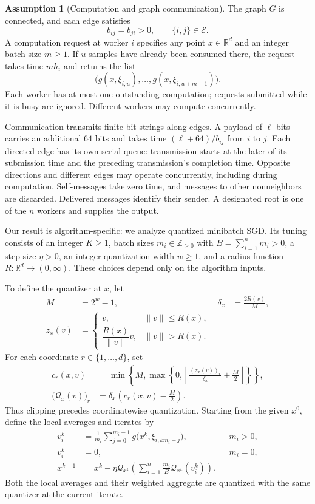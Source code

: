 \documentclass[10pt]{article}
\theoremstyle{definition}
\newtheorem{assumption}{Assumption}
\begin{document}
\begin{assumption}[Computation and graph communication]
The graph $G$ is connected, and each edge satisfies
\[
b_{ij}=b_{ji}>0,
\qquad \{i,j\}\in\mathcal{E}.
\]
A computation request at worker $i$ specifies any point $x\in\mathbb{R}^d$ and an integer batch size $m\geq1$. If $u$ samples have already been consumed there, the request takes time $mh_i$ and returns the list
\[
\bigl(g(x,\xi_{i,u}),\ldots,g(x,\xi_{i,u+m-1})\bigr).
\]
Each worker has at most one outstanding computation; requests submitted while it is busy are ignored. Different workers may compute concurrently.

Communication transmits finite bit strings along edges. A payload of $\ell$ bits carries an additional $64$ bits and takes time $(\ell+64)/b_{ij}$ from $i$ to $j$. Each directed edge has its own serial queue: transmission starts at the later of its submission time and the preceding transmission's completion time. Opposite directions and different edges may operate concurrently, including during computation. Self-messages take zero time, and messages to other nonneighbors are discarded. Delivered messages identify their sender. A designated root is one of the $n$ workers and supplies the output.
\end{assumption}

Our result is algorithm-specific: we analyze quantized minibatch SGD. Its tuning consists of an integer $K\geq1$, batch sizes $m_i\in\mathbb{Z}_{\geq0}$ with $B=\sum_{i=1}^n m_i>0$, a step size $\eta>0$, an integer quantization width $w\geq1$, and a radius function $R:\mathbb{R}^d\to(0,\infty)$. These choices depend only on the algorithm inputs.

To define the quantizer at $x$, let
\[
\begin{aligned}
M&=2^w-1,
&\delta_x&=\frac{2R(x)}{M},\\
z_x(v)&=
\begin{cases}
v,&\|v\|\leq R(x),\\
\dfrac{R(x)}{\|v\|}v,&\|v\|>R(x).
\end{cases}
\end{aligned}
\]
For each coordinate $r\in\{1,\ldots,d\}$, set
\[
\begin{aligned}
c_r(x,v)
 &=\min\!\left\{M,\max\!\left\{0,
 \left\lfloor\frac{(z_x(v))_r}{\delta_x}
                    +\frac{M}{2}\right\rfloor\right\}\right\},\\
\bigl(\mathcal{Q}_x(v)\bigr)_r
 &=\delta_x\left(c_r(x,v)-\frac{M}{2}\right).
\end{aligned}
\]
Thus clipping precedes coordinatewise quantization. Starting from the given $x^0$, define the local averages and iterates by
\[
\begin{aligned}
v_i^k
 &=\frac{1}{m_i}\sum_{j=0}^{m_i-1}
       g\bigl(x^k,\xi_{i,km_i+j}\bigr),
 &&m_i>0,\\
v_i^k&=0,
 &&m_i=0,\\
x^{k+1}
 &=x^k-\eta\mathcal{Q}_{x^k}\left(
       \sum_{i=1}^n\frac{m_i}{B}
            \mathcal{Q}_{x^k}(v_i^k)\right).
\end{aligned}
\]
Both the local averages and their weighted aggregate are quantized with the same quantizer at the current iterate.
\end{document}
